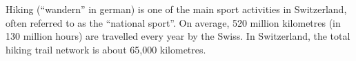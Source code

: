 Hiking (``wandern'' in german) is one of the main sport activities in Switzerland, often referred to as the ``national sport''.
On average, 520 million kilometres (in 130 million hours) are travelled every year by the Swiss.
In Switzerland, the total hiking trail network is about 65,000 kilometres.